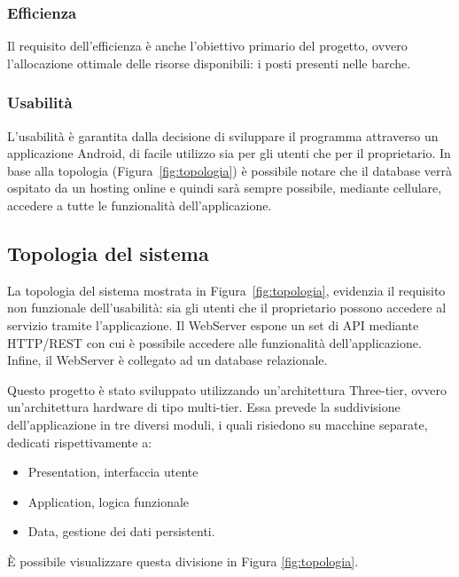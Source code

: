 \subsubsection{Efficienza}
Il requisito dell'efficienza è anche l'obiettivo primario del progetto, ovvero l'allocazione ottimale delle risorse disponibili: i posti presenti nelle barche.
\subsubsection{Usabilità}
L'usabilità è garantita dalla decisione di sviluppare il programma attraverso un applicazione Android, di facile utilizzo sia per gli utenti che per il proprietario. In base alla topologia (Figura~\ref{fig:topologia}) è possibile notare che il database verrà ospitato da un hosting online e quindi sarà sempre possibile, mediante cellulare, accedere a tutte le funzionalità dell'applicazione.

\newpage

\subsection{Topologia del sistema}
La topologia del sistema mostrata in Figura~\ref{fig:topologia}, evidenzia il requisito non funzionale dell'usabilità: sia gli utenti che il proprietario possono accedere al servizio tramite l'applicazione. Il WebServer espone un set di API mediante HTTP/REST con cui è possibile accedere alle funzionalità dell'applicazione. Infine, il WebServer è collegato ad un database relazionale.

Questo progetto è stato sviluppato utilizzando un’architettura Three-tier, ovvero un’architettura hardware di tipo multi-tier. Essa prevede la suddivisione dell’applicazione in tre diversi moduli, i quali risiedono su macchine separate, dedicati rispettivamente a:
\begin{itemize}
    \item Presentation, interfaccia utente
    \item Application, logica funzionale
    \item Data, gestione dei dati persistenti.
\end{itemize}

È possibile visualizzare questa divisione in Figura \ref{fig:topologia}.

